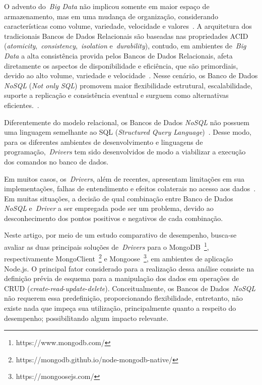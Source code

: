 \documentclass[12pt]{article}
\begin{document}
O advento do~\emph{Big Data} não implicou somente em maior espaço de armazenamento, mas em uma mudança de organização, considerando características como volume, variedade, velocidade e valores~\cite{ward2013undefined}. A arquitetura dos tradicionais Bancos de Dados Relacionais são baseadas nas propriedades ACID (\textit{atomicity},~\textit{consistency},~\textit{isolation} e~\textit{durability}), contudo, em ambientes de~\emph{Big Data} a alta consistência provida pelos Bancos de Dados Relacionais, afeta diretamente os aspectos de disponibilidade e eficiência, que são primordiais, devido ao alto volume, variedade e velocidade~\cite{aparicio:2016}. Nesse cenário, os Banco de Dados \textit{NoSQL} (\emph{Not only SQL}) promovem maior flexibilidade estrutural, escalabilidade, suporte a replicação e consistência eventual e surguem como alternativas eficientes.~\cite{han2011survey}. 
 
Diferentemente do modelo relacional, os Bancos de Dados \textit{NoSQL} não possuem uma linguagem semelhante ao SQL (\emph{Structured Query Language})~\cite{bugiotti2013object,sellami2014odbapi}. Desse modo, para os diferentes ambientes de desenvolvimento e linguagens de programação,~\emph{Drivers} tem sido desenvolvidos de modo a viabilizar a execução dos comandos no banco de dados. 

Em muitos casos, os~\emph{Drivers}, além de recentes, apresentam limitações em sua implementações, falhas de entendimento e efeitos colaterais no acesso aos dados~\cite{rafique:2018}. Em muitas situações, a decisão de qual combinação entre Banco de Dados \textit{NoSQL} e~\emph{Driver} a ser empregada pode ser um problema, devido ao desconhecimento dos pontos positivos e negativos de cada combinação.

Neste artigo, por meio de um estudo comparativo de desempenho, busca-se avaliar as duas principais soluções de~\emph{Drivers} para o MongoDB~\footnote{https://www.mongodb.com/}, respectivamente MongoClient~\footnote{https://mongodb.github.io/node-mongodb-native/} e Mongoose~\footnote{https://mongoosejs.com/}, em ambientes de aplicação Node.js. 
O principal fator considerado para a realização dessa análise consiste na definição prévia de esquema para a manipulação dos dados em operações de CRUD (\emph{create}-\emph{read}-\emph{update}-\emph{delete}). Conceitualmente, os Bancos de Dados~\textit{NoSQL} não requerem essa predefinição, proporcionando flexibilidade, entretanto, não existe nada que impeça sua utilização, principalmente quanto a respeito do desempenho; possibilitando algum impacto relevante.
\end{document}
